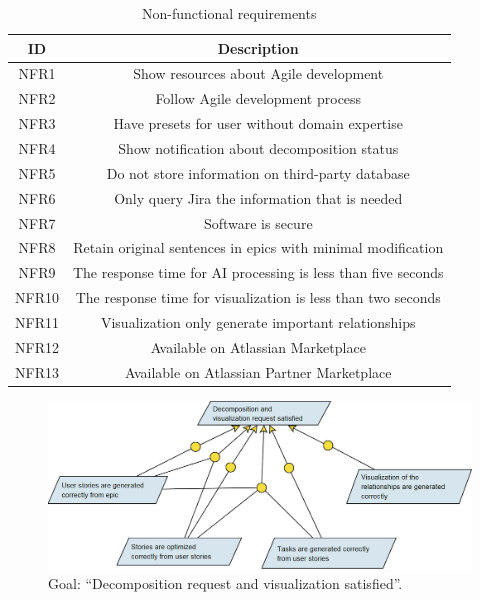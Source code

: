 \begin{table}
\centering
\caption{Non-functional requirements}
\label{nfrs}
\begin{tabular}{ |c|c| } 
\hline
\multicolumn{1}{|c|}{\textbf{ID}} & \multicolumn{1}{c|}{\textbf{Description}} \\
\hline
NFR1 & Show resources about Agile development \\
\hline
NFR2 & Follow Agile development process \\
\hline
NFR3 & Have presets for user without domain expertise \\
\hline
NFR4 & Show notification about decomposition status \\
\hline
NFR5 & Do not store information on third-party database \\
\hline
NFR6 & Only query Jira the information that is needed \\
\hline
NFR7 & Software is secure \\
\hline
NFR8 & Retain original sentences in epics with minimal modification \\
\hline
NFR9 & The response time for AI processing is less than five seconds \\
\hline
NFR10 & The response time for visualization is less than two seconds \\
\hline
NFR11 & Visualization only generate important relationships \\
\hline
NFR12 & Available on Atlassian Marketplace \\
\hline
NFR13 & Available on Atlassian Partner Marketplace \\
\hline
\end{tabular}
\end{table}

\begin{figure}
\centerline{\includegraphics[width=\textwidth,height=\textheight,keepaspectratio]{./figure/GoalsNFR2.png}}
\caption{Goal: “Decomposition request and visualization satisfied”.}
\label{frgs}
\end{figure}

